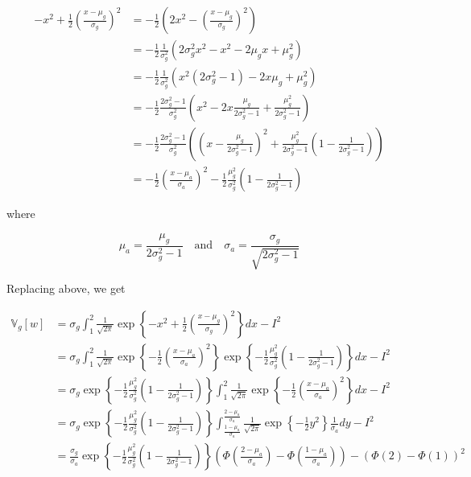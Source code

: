 \[ 
\begin{align}
-x^2 +\frac{1}{2} \left(\frac{x - \mu_g}{\sigma_g}\right)^2 &= -\frac{1}{2} \left( 2x^2 -  \left(\frac{x - \mu_g}{\sigma_g}\right)^2 \right) \\
&= -\frac{1}{2} \frac{1}{\sigma_g^2} \left( 2 \sigma_g^2 x^2  - x^2 - 2 \mu_g x + \mu_g^2 \right) \\
&= -\frac{1}{2} \frac{1}{\sigma_g^2} \left( x^2 (2\sigma_g^2 - 1) - 2x \mu_g + \mu_g^2 \right) \\
&= -\frac{1}{2} \frac{2\sigma_g^2 - 1}{\sigma_g^2} \left( x^2 - 2x \frac{\mu_g}{2\sigma_g^2 - 1} + \frac{\mu_g^2}{2\sigma_g^2 - 1} \right) \\
&= -\frac{1}{2} \frac{2\sigma_g^2 - 1}{\sigma_g^2} \left( \left( x - \frac{\mu_g}{2\sigma_g^2 - 1} \right)^2  + \frac{\mu_g^2}{2\sigma_g^2 - 1}\left(1 - \frac{1}{2\sigma_g^2 - 1} \right) \right) \\
&= -\frac{1}{2} \left( \frac{x - \mu_a}{\sigma_a} \right)^2 - \frac{1}{2} \frac{\mu_g^2}{\sigma_g^2} \left(1 - \frac{1}{2\sigma_g^2 - 1} \right)
\end{align}
\]

where

\[ \mu_a = \frac{\mu_g}{2\sigma_g^2 - 1} 
\quad \text{and} \quad
\sigma_a = \frac{\sigma_g}{\sqrt{2 \sigma_g^2 - 1}} \]

Replacing above, we get

\[
\begin{align}
\mathbb{V}_g[w] &= \sigma_g \int_1^2 \frac{1}{\sqrt{2 \pi}} \exp \left\{ -x^2 +\frac{1}{2} \left(\frac{x - \mu_g}{\sigma_g}\right)^2 \right\} dx - I^2 \\
&= \sigma_g \int_1^2 \frac{1}{\sqrt{2 \pi}} \exp \left\{ -\frac{1}{2} \left( \frac{x - \mu_a}{\sigma_a} \right)^2 \right\} \exp \left\{ - \frac{1}{2} \frac{\mu_g^2}{\sigma_g^2} \left(1 - \frac{1}{2\sigma_g^2 - 1} \right) \right\} dx - I^2 \\
&= \sigma_g \exp \left\{ - \frac{1}{2} \frac{\mu_g^2}{\sigma_g^2} \left(1 - \frac{1}{2\sigma_g^2 - 1} \right) \right\} \int_1^2 \frac{1}{\sqrt{2 \pi}} \exp \left\{ -\frac{1}{2} \left( \frac{x - \mu_a}{\sigma_a} \right)^2 \right\} dx - I^2 \\
&= \sigma_g \exp \left\{ - \frac{1}{2} \frac{\mu_g^2}{\sigma_g^2} \left(1 - \frac{1}{2\sigma_g^2 - 1} \right) \right\} \int_{\frac{1 - \mu_a}{\sigma_a}}^{\frac{2 - \mu_a}{\sigma_a}} \frac{1}{\sqrt{2 \pi}} \exp \left\{ -\frac{1}{2} y^2 \right\} \frac{1}{\sigma_a} dy - I^2 \\
&= \frac{\sigma_g}{\sigma_a} \exp \left\{ - \frac{1}{2} \frac{\mu_g^2}{\sigma_g^2} \left(1 - \frac{1}{2\sigma_g^2 - 1} \right) \right\}  \left( \Phi\left(\frac{2 - \mu_a}{\sigma_a}\right) - \Phi\left(\frac{1 - \mu_a}{\sigma_a}\right) \right) - \left( \Phi(2) - \Phi(1) \right)^2
\end{align}
\]

